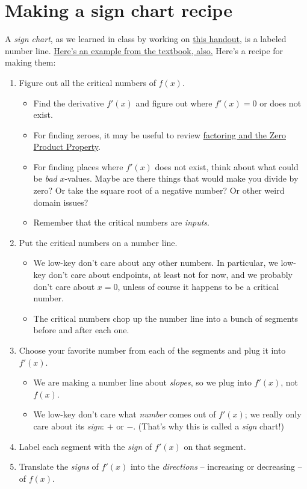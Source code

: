 \pagebreak


\section{Making a sign chart recipe}
A \textit{sign chart}, as we learned in class by working on \href{https://rhinopotamus.github.io/pdf/highest-and-lowest.pdf}{this handout}, is a labeled number line. \href{https://activecalculus.org/single/sec-3-3-tests.html#Ex-f-from-f-prime}{Here's an example from the textbook, also.} Here's a recipe for making them:

\begin{enumerate}[leftmargin=15pt]
    \item Figure out all the critical numbers of $f(x)$.
    \begin{itemize}
        \item Find the derivative $f'(x)$ and figure out where $f'(x) = 0$ or does not exist.
        \item For finding zeroes, it may be useful to review \href{https://spot.pcc.edu/math/orcca/ed2/html/section-solving-quadratic-equations-by-factoring.html}{factoring and the Zero Product Property}.
        \item For finding places where $f'(x)$ does not exist, think about what could be \textit{bad} $x$-values. Maybe are there things that would make you divide by zero? Or take the square root of a negative number? Or other weird domain issues?
        \item Remember that the critical numbers are \textit{inputs}.
    \end{itemize}
    \item Put the critical numbers on a number line. 
    \begin{itemize}
        \item We low-key don't care about any other numbers. In particular, we low-key don't care about endpoints, at least not for now, and we probably don't care about $x=0$, unless of course it happens to be a critical number.
        \item The critical numbers chop up the number line into a bunch of segments before and after each one.
    \end{itemize}
    \item Choose your favorite number from each of the segments and plug it into $f'(x)$.
    \begin{itemize}
        \item We are making a number line about \textit{slopes}, so we plug into $f'(x)$, not $f(x)$.
        \item We low-key don't care what \textit{number} comes out of $f'(x)$; we really only care about its \textit{sign}: $+$ or $-$. (That's why this is called a \textit{sign} chart!)
    \end{itemize}
    \item Label each segment with the \textit{sign} of $f'(x)$ on that segment.
    \item Translate the \textit{signs} of $f'(x)$ into the \textit{directions} -- increasing or decreasing -- of $f(x)$.
\end{enumerate}
